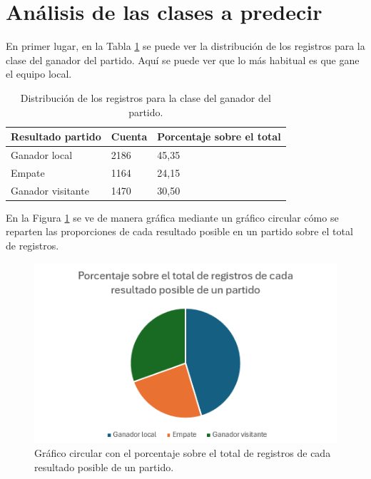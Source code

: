 \section{Análisis de las clases a predecir}
En primer lugar, en la Tabla \ref{fig:distribucion-ganador} se puede ver la distribución de los registros para la clase del ganador del partido. Aquí se puede ver que lo más habitual es que gane el equipo local.
\begin{table}[]
    \centering
    \begin{tabular}{|l|l|l|}
    \hline
    \rowcolor[HTML]{C0C0C0} 
    Resultado partido & Cuenta & Porcentaje sobre el total \\ \hline
    Ganador local     & 2186   & 45,35                     \\ \hline
    Empate            & 1164   & 24,15                     \\ \hline
    Ganador visitante & 1470   & 30,50                     \\ \hline
    \end{tabular}
    \caption{Distribución de los registros para la clase del ganador del partido. }
    \label{fig:distribucion-ganador}
\end{table}

En la Figura \ref{fig:grafico-circular-ganador} se ve de manera gráfica mediante un gráfico circular cómo se reparten las proporciones de cada resultado posible en un partido sobre el total de registros.
\begin{figure}[H]
    \centering
    \includegraphics[scale=0.75]{svg/grafico-circular-ganador.png}
    \caption{Gráfico circular con el porcentaje sobre el total de registros de cada resultado posible de un partido. }
    \label{fig:grafico-circular-ganador}
\end{figure}







